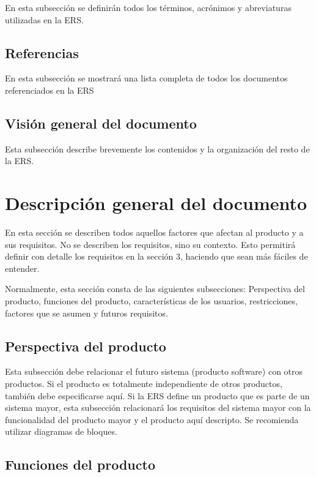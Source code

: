 \documentclass[12pt,a4paper, twosite]{article}
\begin{document}
En esta subsección se definirán todos los términos, acrónimos y
abreviaturas utilizadas en la ERS.


\subsection{Referencias}
\label{sec:org62711e0}

En esta subsección se mostrará una lista completa de todos los
documentos referenciados en la ERS


\subsection{Visión general del documento}
\label{sec:orgdaca22c}

Esta subsección describe brevemente los contenidos y la organización
del resto de la ERS.


\section{Descripción general del documento}
\label{sec:orgc1c4017}

En esta sección se describen todos aquellos factores que afectan al
producto y a sus requisitos. No se describen los requisitos, sino su
contexto. Esto permitirá definir con detalle los requisitos en la
sección 3, haciendo que sean más fáciles de entender.

Normalmente, esta sección consta de las siguientes subsecciones:
Perspectiva del producto, funciones del producto, características de
los usuarios, restricciones, factores que se asumen y futuros
requisitos.


\subsection{Perspectiva del producto}
\label{sec:org24980a8}

Esta subsección debe relacionar el futuro sistema (producto
software) con otros productos. Si el producto es totalmente
independiente de otros productos, también debe especificarse
aquí. Si la ERS define un producto que es parte de un sistema mayor,
esta subsección relacionará los requisitos del sistema mayor con la
funcionalidad del producto mayor y el producto aquí descripto. Se
recomienda utilizar diagramas de bloques.


\subsection{Funciones del producto}
\label{sec:orgaf51da6}
\end{document}
